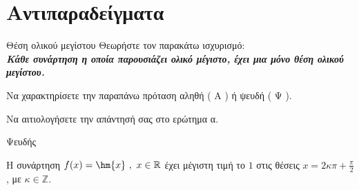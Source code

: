\section{Αντιπαραδείγματα}
\begin{Αntiparadeigmabox}{Θέση ολικού μεγίστου}
Θεωρήστε τον παρακάτω ισχυρισμό:\\
\textbf{\textit{Κάθε συνάρτηση  η οποία παρουσιάζει ολικό μέγιστο, έχει μια μόνο θέση ολικού μεγίστου.}}
\begin{alist}
\item Να χαρακτηρίσετε την παραπάνω πρόταση αληθή ( Α ) ή ψευδή ( Ψ ).
\item Να αιτιολογήσετε την απάντησή σας στο ερώτημα α.
\end{alist}
\end{Αntiparadeigmabox}
\apanthsh
\vspace{-7mm}
\begin{alist}
\item Ψευδής
\item Η συνάρτηση $f(x)=\hm{x}\ ,\ x\in\mathbb{R}$ έχει μέγιστη τιμή το $1$ στις θέσεις $x=2\kappa\pi+\frac{\pi}{2}$, με $\kappa\in\mathbb{Z}$.
\end{alist}